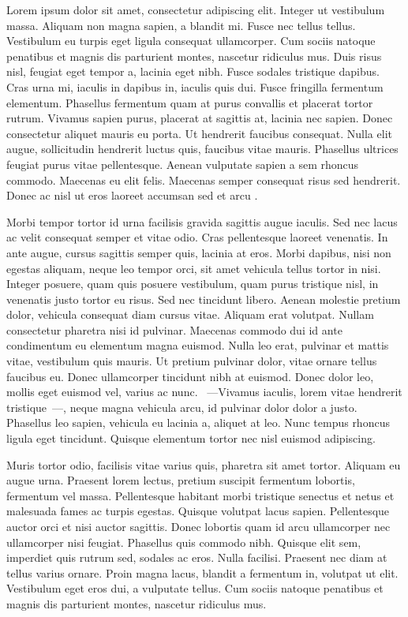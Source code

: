 Lorem ipsum dolor sit amet, consectetur adipiscing elit. Integer ut vestibulum
massa. Aliquam non magna sapien, a blandit mi. Fusce nec tellus tellus.
Vestibulum eu turpis eget ligula consequat ullamcorper. Cum sociis natoque
penatibus et magnis dis parturient montes, nascetur ridiculus mus. Duis risus
nisl, feugiat eget tempor a, lacinia eget nibh. Fusce sodales tristique
dapibus. Cras urna mi, iaculis in dapibus in, iaculis quis dui. Fusce
fringilla fermentum elementum. Phasellus fermentum quam at purus convallis et
placerat tortor rutrum. Vivamus sapien purus, placerat at sagittis at, lacinia
nec sapien. Donec consectetur aliquet mauris eu porta. Ut hendrerit faucibus
consequat. Nulla elit augue, sollicitudin hendrerit luctus quis, faucibus
vitae mauris. Phasellus ultrices feugiat purus vitae pellentesque. Aenean
vulputate sapien a sem rhoncus commodo. Maecenas eu elit felis. Maecenas
semper consequat risus sed hendrerit. Donec ac nisl ut eros laoreet accumsan
sed et arcu \cite{Bentley1980}.

Morbi tempor tortor id urna facilisis gravida sagittis augue iaculis. Sed nec
lacus ac velit consequat semper et vitae odio. Cras pellentesque laoreet
venenatis. In ante augue, cursus sagittis semper quis, lacinia at eros. Morbi
dapibus, nisi non egestas aliquam, neque leo tempor orci, sit amet vehicula
tellus tortor in nisi. Integer posuere, quam quis posuere vestibulum, quam
purus tristique nisl, in venenatis justo tortor eu risus. Sed nec tincidunt
libero. Aenean molestie pretium dolor, vehicula consequat diam cursus vitae.
Aliquam erat volutpat. Nullam consectetur pharetra nisi id pulvinar. Maecenas
commodo dui id ante condimentum eu elementum magna euismod. Nulla leo erat,
pulvinar et mattis vitae, vestibulum quis mauris. Ut pretium pulvinar dolor,
vitae ornare tellus faucibus eu. Donec ullamcorper tincidunt nibh at euismod.
Donec dolor leo, mollis eget euismod vel, varius ac nunc. ~---Vivamus iaculis,
lorem vitae hendrerit tristique~---, neque magna vehicula arcu, id pulvinar
dolor dolor a justo. Phasellus leo sapien, vehicula eu lacinia a, aliquet at
leo. Nunc tempus rhoncus ligula eget tincidunt. Quisque elementum tortor nec
nisl euismod adipiscing.

Muris tortor odio, facilisis vitae varius quis, pharetra sit amet tortor.
Aliquam eu augue urna. Praesent lorem lectus, pretium suscipit fermentum
lobortis, fermentum vel massa. Pellentesque habitant morbi tristique senectus
et netus et malesuada fames ac turpis egestas. Quisque volutpat lacus sapien.
Pellentesque auctor orci et nisi auctor sagittis. Donec lobortis quam id arcu
ullamcorper nec ullamcorper nisi feugiat. Phasellus quis commodo nibh. Quisque
elit sem, imperdiet quis rutrum sed, sodales ac eros. Nulla facilisi. Praesent
nec diam at tellus varius ornare. Proin magna lacus, blandit a fermentum in,
volutpat ut elit. Vestibulum eget eros dui, a vulputate tellus. Cum sociis
natoque penatibus et magnis dis parturient montes, nascetur ridiculus mus.

